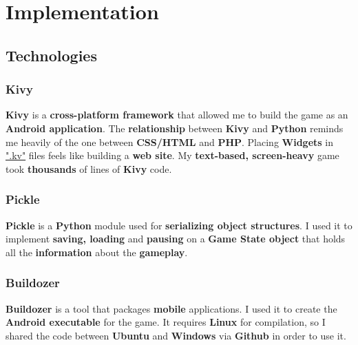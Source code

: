 \chapter{Implementation} 

	\section{Technologies}
		\subsection{Kivy}
			\par \textbf{Kivy}\cite{Kivy} is a \textbf{cross-platform framework} that allowed me to build the game as an \textbf{Android application}. The \textbf{relationship} between \textbf{Kivy} and \textbf{Python} reminds me heavily of the one between \textbf{CSS/HTML} and \textbf{PHP}. Placing \textbf{Widgets} in \underline{".kv"} files feels like building a \textbf{web site}. My \textbf{text-based, screen-heavy} game took \textbf{thousands} of lines of \textbf{Kivy} code. 

		\subsection{Pickle}
			\par \textbf{Pickle}\cite{Pickle} is a \textbf{Python} module used for \textbf{serializing object structures}. I used it to implement \textbf{saving, loading} and \textbf{pausing} on a \textbf{Game State object} that holds all the \textbf{information} about the \textbf{gameplay}. 
		
	\subsection{Buildozer}
		\par \textbf{Buildozer}\cite{Buildozer} is a tool that packages \textbf{mobile} applications. I used it to create the \textbf{Android executable} for the game. It requires \textbf{Linux} for compilation, so I shared the code between \textbf{Ubuntu} and \textbf{Windows} via \textbf{Github} in order to use it.
	
